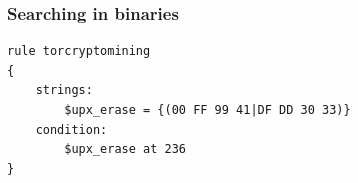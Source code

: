 \documentclass{beamer}
\begin{document}
\lstset{language=Python}
\begin{frame}[fragile]
\frametitle{Searching in binaries}
	\begin{lstlisting}
rule torcryptomining
{
    strings:
        $upx_erase = {(00 FF 99 41|DF DD 30 33)}
    condition:
        $upx_erase at 236
}
	\end{lstlisting}
\end{frame}
\end{document}

